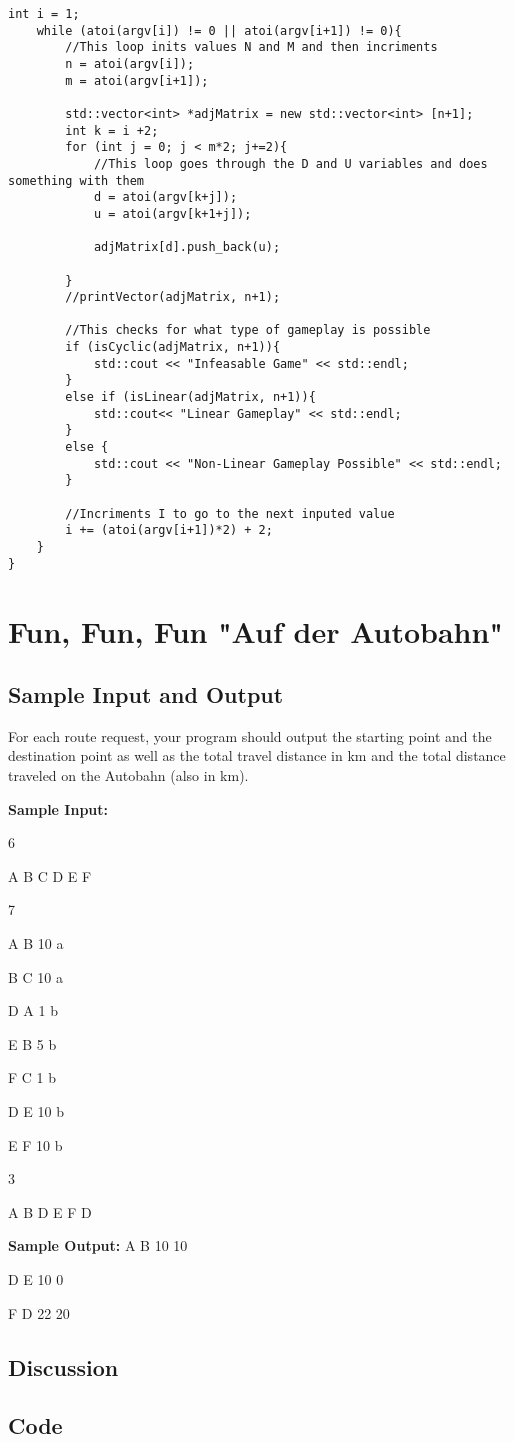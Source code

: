\documentclass[11pt]{article}
\begin{document}
\begin{lstlisting}[frame=single]
    int i = 1;
    while (atoi(argv[i]) != 0 || atoi(argv[i+1]) != 0){
        //This loop inits values N and M and then incriments 
        n = atoi(argv[i]);
        m = atoi(argv[i+1]);
        
        std::vector<int> *adjMatrix = new std::vector<int> [n+1];
        int k = i +2;
        for (int j = 0; j < m*2; j+=2){
            //This loop goes through the D and U variables and does something with them
            d = atoi(argv[k+j]);
            u = atoi(argv[k+1+j]);
            
            adjMatrix[d].push_back(u);        
                       
        }
        //printVector(adjMatrix, n+1);

        //This checks for what type of gameplay is possible
        if (isCyclic(adjMatrix, n+1)){ 
            std::cout << "Infeasable Game" << std::endl;
        }
        else if (isLinear(adjMatrix, n+1)){
            std::cout<< "Linear Gameplay" << std::endl;
        }
        else {
            std::cout << "Non-Linear Gameplay Possible" << std::endl;
        }
        
        //Incriments I to go to the next inputed value
        i += (atoi(argv[i+1])*2) + 2;
    }
}
\end{lstlisting}
\section{Fun, Fun, Fun "Auf der Autobahn"}  
\subsection{Sample Input and Output}
For each route request, your program should output the starting point and the destination point as well as the total travel distance in km and the total distance traveled on the Autobahn (also in km).
\begin{flushleft}
\textbf{Sample Input:}
\vspace{2mm}
\par
6

A B C D E F

7

A B 10 a

B C 10 a

D A 1 b

E B 5 b

F C 1 b

D E 10 b

E F 10 b

3

A B
D E
F D
\vspace{2mm}
\par
\textbf{Sample Output:}
A B 10 10 

D E 10 0

F D 22 20
\vspace{2mm}
\par
\end{flushleft}
\subsection{Discussion}
\subsection{Code}
\end{document}
